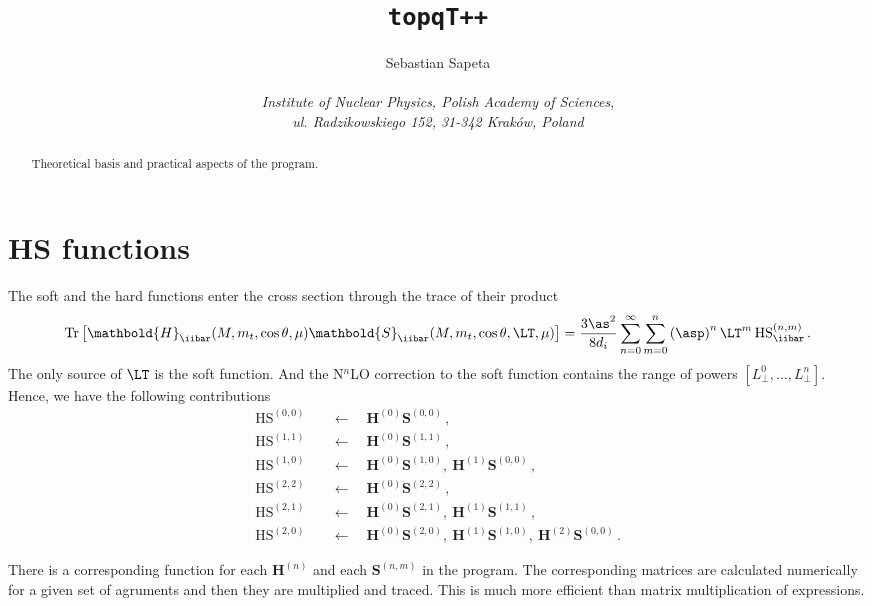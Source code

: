 \documentclass[a4paper,11pt]{article}
\title{\tt topqT++}
\author{
  Sebastian Sapeta \\ \\
  {\it Institute of Nuclear Physics, Polish Academy of Sciences}, \\ 
  {\it ul. Radzikowskiego 152, 31-342 Krak\'ow, Poland}
}
\numberwithin{equation}{section}
\begin{document}
\maketitle


\begin{abstract}
  Theoretical basis and practical aspects of the program.
\end{abstract}


\section{HS functions}

The soft and the hard functions enter the cross section through the trace of
their product
%
\begin{equation}
  \text{Tr} \left[\mathbold{H}_{\iibar}(M, m_t, \cos\theta, \mu) 
                  \mathbold{S}_{\iibar}(M, m_t, \cos\theta, \LT, \mu)\right] = 
  \frac{3\as^2}{8 d_i} \sum_{n=0}^\infty  \sum^{n}_{m=0}
  \left(\asp\right)^n \LT^m\,
  \text{HS}^{(n,m)}_\iibar\,.
\end{equation}
%
The only source of $\LT$ is the soft function.  And the N$^n$LO correction to
the soft function contains the range of powers $[L_\perp^0,\ldots, L_\perp^n]$.
%
Hence, we have the following contributions
%
\begin{align}
  \text{HS}^{(0,0)} & 
  \quad \leftarrow  \quad \mathbold{H}^{(0)} \mathbold{S}^{(0,0)}\,, \\
  \text{HS}^{(1,1)} & 
  \quad \leftarrow  \quad \mathbold{H}^{(0)} \mathbold{S}^{(1,1)}\,, \\
  \text{HS}^{(1,0)} & 
  \quad \leftarrow  \quad \mathbold{H}^{(0)} \mathbold{S}^{(1,0)},\ 
	                  \mathbold{H}^{(1)} \mathbold{S}^{(0,0)}\,, \\
  \text{HS}^{(2,2)} & 
  \quad \leftarrow  \quad \mathbold{H}^{(0)} \mathbold{S}^{(2,2)}\,, \\
  \text{HS}^{(2,1)} & 
  \quad \leftarrow  \quad \mathbold{H}^{(0)} \mathbold{S}^{(2,1)},\ 
	                  \mathbold{H}^{(1)} \mathbold{S}^{(1,1)}\,, \\
  \text{HS}^{(2,0)} & 
  \quad \leftarrow  \quad \mathbold{H}^{(0)} \mathbold{S}^{(2,0)},\ 
	                  \mathbold{H}^{(1)} \mathbold{S}^{(1,0)},\
	                  \mathbold{H}^{(2)} \mathbold{S}^{(0,0)}\,.
\end{align}

There is a  corresponding function for each 
$\mathbold{H}^{(n)}$ and each $\mathbold{S}^{(n,m)}$ in the program. The
corresponding matrices are calculated numerically for a given set of agruments
and then they are multiplied and traced. This is much more efficient than
matrix multiplication of expressions.



\end{document}

